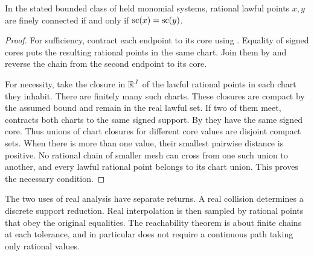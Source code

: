 \begin{theorem}\label{thm:spectral}
In the stated bounded class of held monomial systems, rational lawful
points \(x,y\) are finely connected if and only if \(\operatorname{sc}(x)=\operatorname{sc}(y)\).
\end{theorem}
\begin{proof}
For sufficiency, contract each endpoint to its core using
. Equality of signed cores puts the resulting rational
points in the same chart. Join them by  and reverse
the chain from the second endpoint to its core.

For necessity, take the closure in \(\mathbb{R}^J\) of the lawful rational
points in each chart they inhabit. There are finitely many such charts.
These closures are compact by the assumed bound and remain in the real
lawful set. If two of them meet,  contracts both charts
to the same signed support. By 
they have the same signed core. Thus unions of chart closures for
different core values are disjoint compact sets. When there is more
than one value, their smallest pairwise distance is positive.
No rational chain of smaller mesh can cross from one such union to another,
and every lawful rational point belongs to its chart union.
This proves the necessary condition.
\end{proof}

The two uses of real analysis have separate returns. A real collision
determines a discrete support reduction. Real interpolation is then
sampled by rational points that obey the original equalities. The
reachability theorem is about finite chains at each tolerance, and in
particular does not require a continuous path taking only rational values.
